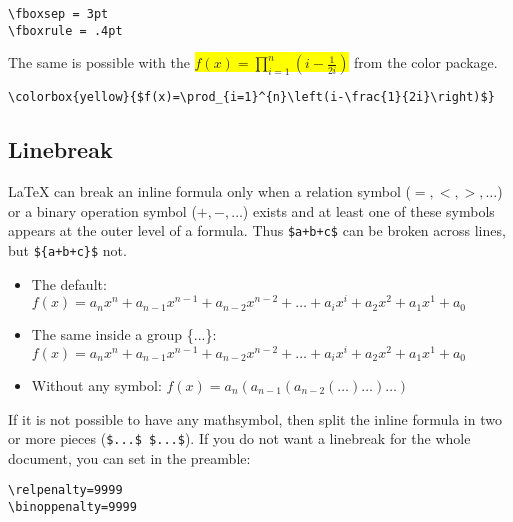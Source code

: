 \bigskip
\begin{minipage}{\fullwidth}
\begin{lstlisting}
\fboxsep = 3pt
\fboxrule = .4pt
\end{lstlisting}
\end{minipage}

The same is possible with the 
\colorbox{yellow}{$f(x)=\prod_{i=1}^{n}\left(i-\frac{1}{2i}\right)$}
from the color package.

\bigskip
\begin{minipage}{\fullwidth}
\begin{lstlisting}
\colorbox{yellow}{$f(x)=\prod_{i=1}^{n}\left(i-\frac{1}{2i}\right)$}
\end{lstlisting}
\end{minipage}


\subsection{Linebreak}\label{subsec:linebreak}

\LaTeX{} can break an inline formula only when a relation symbol ($=, <, >, \ldots$) or a
binary operation symbol ($+,-, \ldots$) exists and at least one of these symbols appears at
the outer level of a formula.
Thus \verb|$a+b+c$| can be broken across lines, but \verb|${a+b+c}$| not.

\begin{itemize}
\item The default: \hspace{1cm}
$f(x)=a_nx^n+a_{n-1}x^{n-1}+a_{n-2}x^{n-2}+\ldots
	+a_ix^i	+a_2x^2	+a_1x^1	+a_0$
\item The same inside a group \{...\}:
${f(x)=a_nx^n+a_{n-1}x^{n-1}+a_{n-2}x^{n-2}+\ldots
	+a_ix^i	+a_2x^2	+a_1x^1	+a_0}$

\item Without any symbol: \hspace{4cm}
$f(x)=a_n\left(a_{n-1}\left(a_{n-2}\left(\ldots\right)\ldots\right)\ldots\right)$
\end{itemize}

If it is not possible to have any mathsymbol, then split the inline formula in two
or more pieces (\verb|$...$ $...$|). If you do not want a linebreak for the whole
document, you can set in the preamble:
\begin{verbatim}
\relpenalty=9999
\binoppenalty=9999
\end{verbatim}

